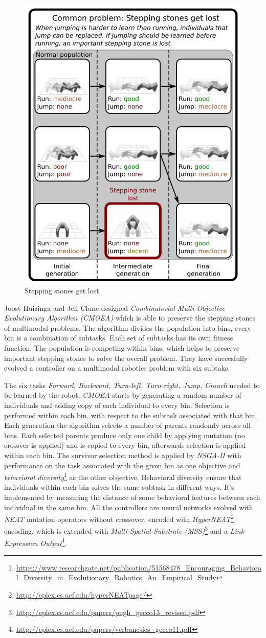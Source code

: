 \documentclass[format=acmsmall, review=false, screen=true]{acmart}
\begin{document}
\begin{figure}[H]
  \includegraphics[width=0.46\linewidth]{img/jumping_running.JPEG}
  \caption{\label{fig:jumping_running}Stepping stones get lost}
\end{figure}

Joost Huizinga and Jeff Clune designed \emph{Combinatorial Multi-Objective Evolutionary Algorithm (CMOEA)} which is able to preserve the stepping stones of multimodal problems. The algorithm divides the population into bins, every bin is a combination of subtasks. Each set of subtasks has its own fitness function. The population is competing within bins, which helps to preserve important stepping stones to solve the overall problem. They have succesfully evolved a controller on a multimodal robotics problem with six subtaks.

The six tasks \emph{Forward, Backward, Turn-left, Turn-right, Jump, Crouch} needed to be learned by the robot. \emph{CMOEA} starts by generating a random number of individuals and adding copy of each individual to every bin. Selection is performed within each bin, with respect to the subtask associated with that bin. Each generation the algorithm selects a number of parents randomly across all bins. Each selected parents produce only one child by applying mutation (no crossver is applied) and is copied to every bin, afterwards selection is applied within each bin. The survivor selection method is applied by \emph{NSGA-II} with performance on the task associated with the given bin as one objective and \emph{behavioral diversity}\footnote{\url{https://www.researchgate.net/publication/51568478_Encouraging_Behavioral_Diversity_in_Evolutionary_Robotics_An_Empirical_Study}} as the other objective. Behavioral diversity ensure that individuals within each bin solves the same subtask in different ways. It's implemented by measuring the distance of some behavioral features between each individual in the same bin. All the controllers are neural networks evolved with \emph{NEAT} mutation operators without crossover, encoded with \emph{HyperNEAT}\footnote{\url{http://eplex.cs.ucf.edu/hyperNEATpage/}} encoding, which is extended with \emph{Multi-Spatial Substrate (MSS)}\footnote{\url{http://eplex.cs.ucf.edu/papers/pugh_gecco13_revised.pdf}} and a \emph{Link Expression Output}\footnote{\url{http://eplex.cs.ucf.edu/papers/verbancsics_gecco11.pdf}}.
\end{document}

